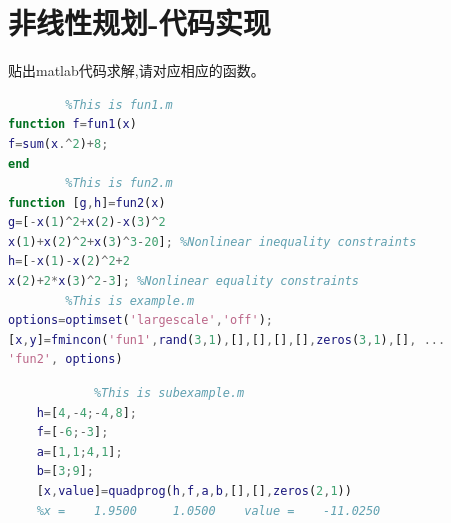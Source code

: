 \documentclass[a4paper,20pt]{article}
\begin{document}
\section{非线性规划-代码实现}
\par 贴出matlab代码求解,请对应相应的函数。
\begin{center}
    \begin{lstlisting}[caption={Fmincon},language=Matlab]
% NonLinear Programming
        %This is fun1.m
function f=fun1(x)
f=sum(x.^2)+8;
end
        %This is fun2.m
function [g,h]=fun2(x)
g=[-x(1)^2+x(2)-x(3)^2 
x(1)+x(2)^2+x(3)^3-20]; %Nonlinear inequality constraints 
h=[-x(1)-x(2)^2+2 
x(2)+2*x(3)^2-3]; %Nonlinear equality constraints
        %This is example.m
options=optimset('largescale','off'); 
[x,y]=fmincon('fun1',rand(3,1),[],[],[],[],zeros(3,1),[], ... 
'fun2', options) 
        \end{lstlisting}
\end{center}
\begin{center}
    \begin{lstlisting}[caption={Quadprog},language=Matlab]
    % NonLinear Programming
            %This is subexample.m
    h=[4,-4;-4,8]; 
    f=[-6;-3]; 
    a=[1,1;4,1]; 
    b=[3;9]; 
    [x,value]=quadprog(h,f,a,b,[],[],zeros(2,1)) 
    %x =    1.9500     1.0500    value =    -11.0250
            \end{lstlisting}
\end{center}
\end{document}
